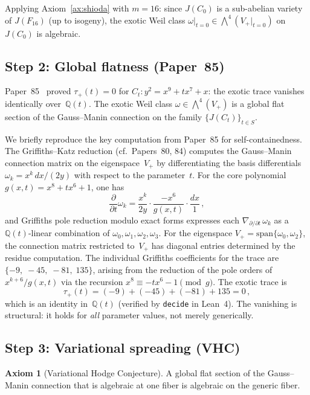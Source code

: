 \documentclass[11pt]{article}
\theoremstyle{plain}
\theoremstyle{definition}
\newtheorem{axiombox}[theorem]{Axiom}
\theoremstyle{remark}
\newcommand{\Q}{\mathbb{Q}}
\begin{document}
Applying Axiom~\ref{ax:shioda} with $m = 16$: since $J(C_0)$ is
a sub-abelian variety of $J(F_{16})$ (up to isogeny), the exotic
Weil class $\omega|_{t=0} \in \bigwedge^4(V_+|_{t=0})$ on $J(C_0)$
is algebraic.

\subsection{Step 2: Global flatness (Paper~85)}

Paper~85~\cite{P85} proved $\tau_+(t) = 0$ for
$C_t\colon y^2 = x^9 + tx^7 + x$: the exotic trace vanishes
identically over~$\Q(t)$.  The exotic Weil class
$\omega \in \bigwedge^4(V_+)$ is a global flat section of the
Gauss--Manin connection on the family $\{J(C_t)\}_{t \in S}$.

We briefly reproduce the key computation from Paper~85 for
self-containedness.  The Griffiths--Katz reduction
(cf.~Papers~80, 84) computes the Gauss--Manin connection matrix
on the eigenspace~$V_+$ by differentiating the basis
differentials $\omega_k = x^k\,dx/(2y)$ with respect to the
parameter~$t$.  For the core polynomial
$g(x,t) = x^8 + tx^6 + 1$, one has
\[
  \frac{\partial}{\partial t} \omega_k
  = \frac{x^k}{2y} \cdot \frac{-x^6}{g(x,t)}
    \cdot \frac{dx}{1}\,,
\]
and Griffiths pole reduction modulo exact forms expresses
each $\nabla_{\partial/\partial t}\,\omega_k$ as a
$\Q(t)$-linear combination of $\omega_0, \omega_1, \omega_2,
\omega_3$.  For the eigenspace $V_+ = \mathrm{span}\{\omega_0,
\omega_2\}$, the connection matrix restricted to~$V_+$ has
diagonal entries determined by the residue computation.
The individual Griffiths coefficients for the trace are
$\{-9,\; -45,\; -81,\; 135\}$, arising from the reduction of
the pole orders of $x^{k+6}/g(x,t)$ via the recursion
$x^8 \equiv -tx^6 - 1 \pmod{g}$.  The exotic trace is
\[
  \tau_+(t) = (-9) + (-45) + (-81) + 135 = 0\,,
\]
which is an identity in~$\Q(t)$ (verified by \texttt{decide} in
Lean~4).  The vanishing is structural: it holds for \emph{all}
parameter values, not merely generically.

\subsection{Step 3: Variational spreading (VHC)}

\begin{axiombox}[Variational Hodge Conjecture]
\label{ax:VHC}
A global flat section of the Gauss--Manin connection that is
algebraic at one fiber is algebraic on the generic fiber.
\end{axiombox}
\end{document}
